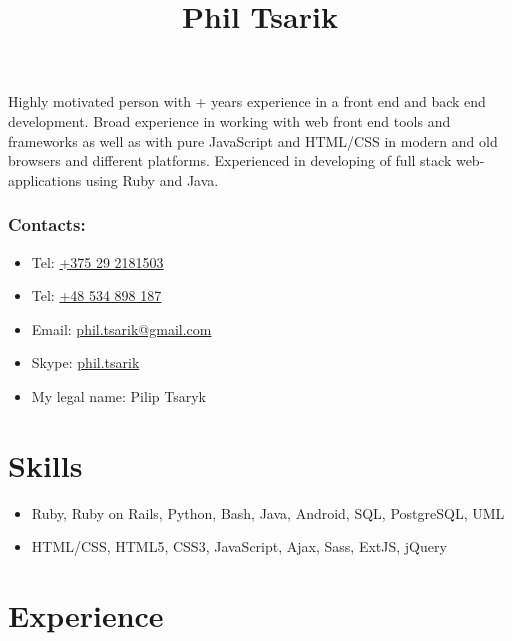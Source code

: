 \documentclass[a4paper, 12pt]{article}
\title{Phil Tsarik}
\author{}
\date{}
\newcommand{\defvalue}[2]{\ifx#1\empty#2\else#1\fi}
\newcommand{\yearsexp}{%
    \FPeval{\result}{clip(\the\year - 2011)}%
    \defvalue{\result}{4+}}
\begin{document}
\maketitle

Highly motivated person with \yearsexp{} years experience in a front end and back end development.
Broad experience in working with web front end tools and frameworks as well as with pure JavaScript and HTML/CSS in modern and old browsers and different platforms.
Experienced in developing of full stack web-applications using Ruby and Java.

\subsubsection*{Contacts:}
\begin{itemize}
    \item Tel: \href{tel:+375292181503}{+375 29 2181503}
    \item Tel: \href{tel:+48534898187}{+48 534 898 187}
    \item Email: \href{mailto:phil.tsarik@gmail.com}{phil.tsarik@gmail.com}
    \item Skype: \href{callto:phil.tsarik}{phil.tsarik}
    \item My legal name: Pilip Tsaryk
\end{itemize}


\section*{Skills}

    \begin{itemize}
        \item Ruby, Ruby on Rails, Python, Bash, Java, Android, SQL, PostgreSQL, UML
        \item HTML/CSS, HTML5, CSS3, JavaScript, Ajax, Sass, ExtJS, jQuery
    \end{itemize}


\section*{Experience}
\end{document}
